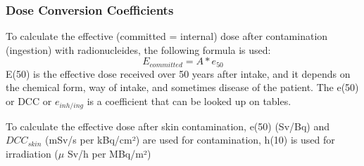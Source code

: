 \subsubsection{Dose Conversion Coefficients}
To calculate the effective (committed = internal) dose after contamination (ingestion) with radionucleides, the following formula is used:
\[ E_{committed} = A*e_{50}\]
E(50) is the effective dose received over 50 years after intake, and it depends on the chemical form, way of intake, and sometimes disease of the patient. The e(50) or DCC or $e_{inh/ing}$ is a coefficient that can be looked up on tables.

To calculate the effective dose after skin contamination, e(50) (Sv/Bq) and $DCC_{skin}$ (mSv/s per kBq/cm²) are used for contamination, h(10) is used for irradiation ($\mu$ Sv/h per MBq/m²)
